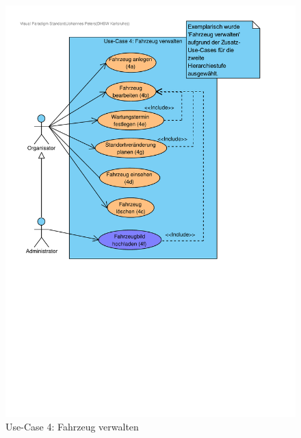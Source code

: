 \begin{figure}[!ht]
    \centering
    \includegraphics[width=\textwidth, trim = 0cm 11cm 0cm 0cm]{Bilder/Diagramme/Use Case 4_ Fahrzeug verwalten.pdf}
    \caption{Use-Case 4: Fahrzeug verwalten}
    \label{img:use_case_4}
\end{figure}
